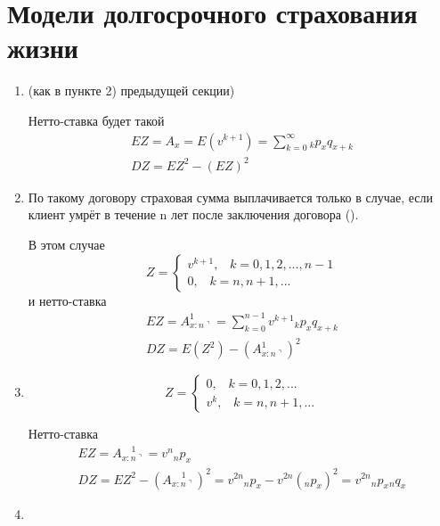 \section{Модели долгосрочного страхования жизни} %
\begin{enumerate}
	\item {} (как в пункте 2) предыдущей секции)

	Нетто-ставка будет такой
	\begin{gather*}
		EZ = A_x = E(v^{k+1}) = \sum\limits_{k = 0}^{\infty}{}_kp_xq_{x+k}\\
		DZ = EZ^2 - (EZ)^2
	\end{gather*}

	\item {}

	По такому договору страховая сумма выплачивается только в случае, если клиент умрёт в течение n лет после заключения договора ().

	В этом случае
	\[
	Z = 
		\begin{cases}
			v^{k+1},\;\;\; k = 0,1, 2, ..., n-1\\
			0 ,\;\;\; k = n, n+1, ...
		\end{cases}
	\] 
	и нетто-ставка
	\begin{gather*}
		EZ = A_{x:n\urcorner}^{1} = \sum\limits_{k=0}^{n-1}v^{k+1}{}_kp_xq_{x+k}\\
		DZ = E(Z^2) - (A_{x:n\urcorner}^{1} )^2
	\end{gather*}

	\item {}

	\[
		Z = \begin{cases}
			0,\;\;\; k = 0,1,2,...\\
			v^k, \;\;\; k = n, n+1, ...
		\end{cases}
	\]

	Нетто-ставка
	\begin{gather*}
		EZ = A_{x:n\urcorner}^{\;\;\;\;1} = v^n{}_np_x\\
		DZ = EZ^2 - (A_{x:n\urcorner}^{\;\;\;\;1})^2 = v^{2n}{}_np_x - v^{2n}({}_np_x)^2 = v^{2n}{}_np_x{}_nq_x
	\end{gather*}

	\item {}


\end{enumerate}
